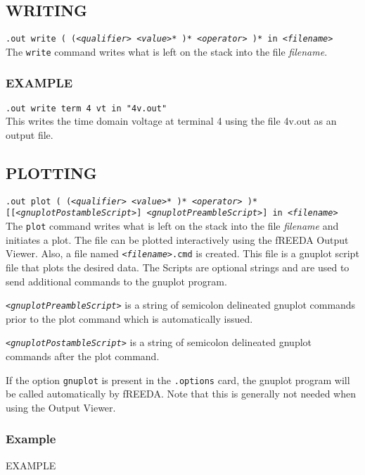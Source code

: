 \subsection[Writing]{WRITING}

{\tt .out write
( (<{\it qualifier}> <{\it value}>* )* <{\it operator}> )*
      in <{\it filename}>} \medskip
\\
The {\tt write} command writes what is left on the stack into the file
{\it filename}.

\subsubsection[Example]{EXAMPLE} 

{\tt .out write term 4 vt in "4v.out"} \medskip
\\
This writes the time domain voltage at terminal 4 using the file
4v.out as an output file.

\subsection[Plotting]{PLOTTING}

{\tt .out plot
( (<{\it qualifier}> <{\it value}>* )* <{\it operator}> )*
[[<{\it gnuplotPostambleScript}>] <{\it gnuplotPreambleScript}>] 
in <{\it filename}>} \medskip
\\
The {\tt plot} command writes what is left on the stack into the file
{\it filename} and initiates a plot. The file can be plotted
interactively using the fREEDA Output Viewer. Also, a file named
{\tt<{\it filename}>.cmd} is created. This file is a gnuplot
\cite{gnuplot} script file that plots the desired data. The Scripts 
are optional strings and are used to send additional commands to the
gnuplot program.

{\tt<{\it gnuplotPreambleScript}>} is a string of semicolon delineated
gnuplot commands prior to the plot command which is automatically
issued.

{\tt<{\it gnuplotPostambleScript}>} is a string of semicolon delineated
gnuplot commands after the plot command.

If the option {\tt gnuplot} is present in the {\tt .options} card, the
gnuplot program will be called automatically by fREEDA. Note that
this is generally not needed when using the Output Viewer.


\subsubsection{Example}{EXAMPLE} 

